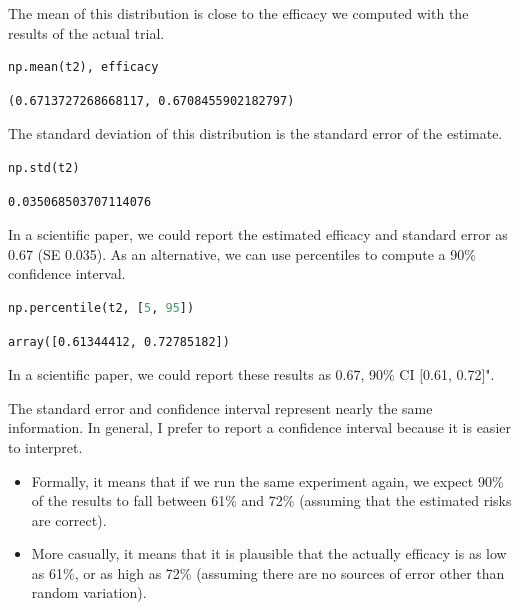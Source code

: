 The mean of this distribution is close to the efficacy we computed with
the results of the actual trial.

\begin{lstlisting}[language=Python,style=source]
np.mean(t2), efficacy
\end{lstlisting}

\begin{lstlisting}[style=output]
(0.6713727268668117, 0.6708455902182797)
\end{lstlisting}

The standard deviation of this distribution is the standard error of the
estimate.

\begin{lstlisting}[language=Python,style=source]
np.std(t2)
\end{lstlisting}

\begin{lstlisting}[style=output]
0.035068503707114076
\end{lstlisting}

In a scientific paper, we could report the estimated efficacy and
standard error as 0.67 (SE 0.035). As an alternative, we can use
percentiles to compute a 90\% confidence interval.

\begin{lstlisting}[language=Python,style=source]
np.percentile(t2, [5, 95])
\end{lstlisting}

\begin{lstlisting}[style=output]
array([0.61344412, 0.72785182])
\end{lstlisting}

In a scientific paper, we could report these results as 0.67, 90\% CI
{[}0.61, 0.72{]}".

The standard error and confidence interval represent nearly the same
information. In general, I prefer to report a confidence interval
because it is easier to interpret.

\begin{itemize}
\item
  Formally, it means that if we run the same experiment again, we expect
  90\% of the results to fall between 61\% and 72\% (assuming that the
  estimated risks are correct).
\item
  More casually, it means that it is plausible that the actually
  efficacy is as low as 61\%, or as high as 72\% (assuming there are no
  sources of error other than random variation).
\end{itemize}

